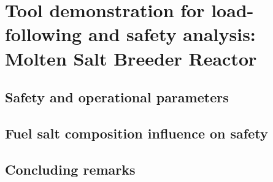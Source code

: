 \chapter{Tool demonstration for load-following and safety analysis: Molten 
Salt Breeder Reactor}

\section{Safety and operational parameters}

\section{Fuel salt composition influence on safety}

\section{Concluding remarks}